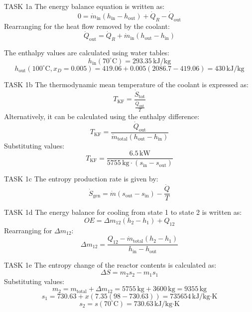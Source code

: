 TASK 1a  
The energy balance equation is written as:  
\[
0 = \dot{m}_{\text{in}} (h_{\text{in}} - h_{\text{out}}) + \dot{Q}_R - \dot{Q}_{\text{out}}
\]  
Rearranging for the heat flow removed by the coolant:  
\[
\dot{Q}_{\text{out}} = \dot{Q}_R + \dot{m}_{\text{in}} (h_{\text{out}} - h_{\text{in}})
\]  

The enthalpy values are calculated using water tables:  
\[
h_{\text{in}}(70^\circ\text{C}) = 293.35 \, \text{kJ/kg}
\]  
\[
h_{\text{out}}(100^\circ\text{C}, x_D = 0.005) = 419.06 + 0.005(2086.7 - 419.06) = 430 \, \text{kJ/kg}
\]  

TASK 1b  
The thermodynamic mean temperature of the coolant is expressed as:  
\[
T_{\text{KF}} = \frac{\dot{S}_{\text{tot}}}{\frac{\dot{Q}_{\text{out}}}{T}}
\]  
Alternatively, it can be calculated using the enthalpy difference:  
\[
T_{\text{KF}} = \frac{\dot{Q}_{\text{out}}}{\dot{m}_{\text{total}} (h_{\text{out}} - h_{\text{in}})}
\]  
Substituting values:  
\[
T_{\text{KF}} = \frac{6.5 \, \text{kW}}{5755 \, \text{kg} \cdot (s_{\text{in}} - s_{\text{out}})}
\]  

TASK 1c  
The entropy production rate is given by:  
\[
\dot{S}_{\text{gen}} = \dot{m} (s_{\text{out}} - s_{\text{in}}) - \frac{\dot{Q}}{T}
\]  

TASK 1d  
The energy balance for cooling from state 1 to state 2 is written as:  
\[
OE = \Delta m_{12} (h_2 - h_1) + Q_{12}
\]  
Rearranging for \( \Delta m_{12} \):  
\[
\Delta m_{12} = \frac{Q_{12} - \dot{m}_{\text{total}} (h_2 - h_1)}{h_{\text{in}} - h_{\text{out}}}
\]  

TASK 1e  
The entropy change of the reactor contents is calculated as:  
\[
\Delta S = m_2 s_2 - m_1 s_1
\]  
Substituting values:  
\[
m_2 = m_{\text{total}} + \Delta m_{12} = 5755 \, \text{kg} + 3600 \, \text{kg} = 9355 \, \text{kg}
\]  
\[
s_1 = 730.63 + x (7.35 (98 - 730.63)) = 735654 \, \text{kJ/kg·K}
\]  
\[
s_2 = s(70^\circ\text{C}) = 730.63 \, \text{kJ/kg·K}
\]